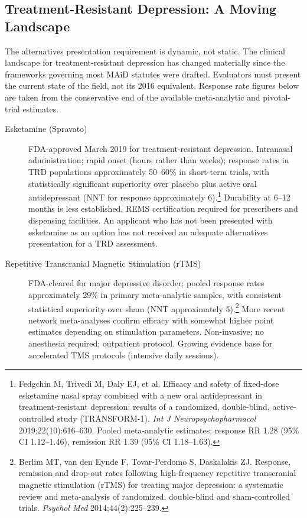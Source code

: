 \documentclass[11pt, letterpaper]{article}
\begin{document}
\subsection{Treatment-Resistant Depression: A Moving Landscape}

The alternatives presentation requirement is dynamic, not static. The clinical landscape
for treatment-resistant depression has changed materially since the frameworks governing
most MAiD statutes were drafted. Evaluators must present the current state of the field,
not its 2016 equivalent. Response rate figures below are taken from the conservative
end of the available meta-analytic and pivotal-trial estimates.

\begin{description}
  \item[Esketamine (Spravato)] FDA-approved March 2019 for treatment-resistant
    depression. Intranasal administration; rapid onset (hours rather than weeks);
    response rates in TRD populations approximately 50--60\% in short-term trials, with
    statistically significant superiority over placebo plus active oral antidepressant
    (NNT for response approximately 6).\footnote{%
    Fedgchin M, Trivedi M, Daly EJ, et al. Efficacy and safety of fixed-dose esketamine
    nasal spray combined with a new oral antidepressant in treatment-resistant
    depression: results of a randomized, double-blind, active-controlled study
    (TRANSFORM-1). \textit{Int J Neuropsychopharmacol} 2019;22(10):616--630.
    Pooled meta-analytic estimates: response RR 1.28 (95\% CI 1.12--1.46), remission
    RR 1.39 (95\% CI 1.18--1.63).}
    Durability at 6--12 months is less established. REMS certification required for
    prescribers and dispensing facilities. An applicant who has not been presented
    with esketamine as an option has not received an adequate alternatives presentation
    for a TRD assessment.

  \item[Repetitive Transcranial Magnetic Stimulation (rTMS)] FDA-cleared for major
    depressive disorder; pooled response rates approximately 29\% in primary
    meta-analytic samples, with consistent statistical superiority over sham (NNT
    approximately 5).\footnote{%
    Berlim MT, van den Eynde F, Tovar-Perdomo S, Daskalakis ZJ. Response, remission and
    drop-out rates following high-frequency repetitive transcranial magnetic stimulation
    (rTMS) for treating major depression: a systematic review and meta-analysis of
    randomized, double-blind and sham-controlled trials. \textit{Psychol Med}
    2014;44(2):225--239.}
    More recent network meta-analyses confirm efficacy with somewhat higher
    point estimates depending on stimulation parameters. Non-invasive; no anesthesia
    required; outpatient protocol. Growing evidence base for accelerated TMS protocols
    (intensive daily sessions).


\end{description}
\end{document}
